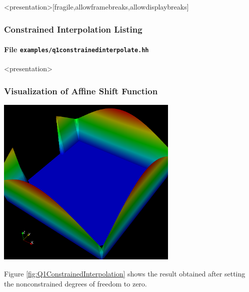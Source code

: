 \begin{frame}<presentation>[fragile,allowframebreaks,allowdisplaybreaks]
\frametitle<presentation>{Constrained Interpolation Listing}
\framesubtitle<presentation>{File \texttt{examples/q1constrainedinterpolate.hh}}

\end{frame}

\begin{frame}<presentation>
\frametitle<presentation>{Visualization of Affine Shift Function}
\begin{center}
\includegraphics[width=0.65\textwidth]{./EPS/q1constrainedinterpolate}
\end{center}
\end{frame}

Figure \ref{fig:Q1ConstrainedInterpolation} shows the result obtained
after setting the nonconstrained degrees of freedom to zero.




\cleardoublepage

